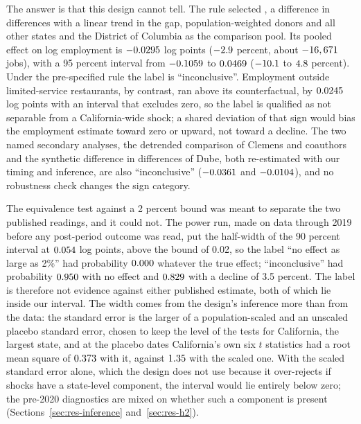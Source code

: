 The answer is that this design cannot tell. The rule selected , a
difference in differences with a linear trend in the gap, population-weighted donors and all
other states and the District of Columbia as the comparison pool. Its pooled effect on log
employment is $-0.0295$ log points ($-2.9$ percent, about $-16,671$ jobs), with a 95
percent interval from $-0.1059$ to $0.0469$ ($-10.1$ to $4.8$
percent). Under the pre-specified rule the label is
``inconclusive''. Employment outside limited-service restaurants, by contrast, ran above its
counterfactual, by $0.0245$ log points with an interval that excludes zero, so the label
is qualified as not separable from a California-wide shock; a shared deviation of that sign
would bias the employment estimate toward zero or upward, not toward a decline. The two named
secondary analyses, the detrended comparison of Clemens and coauthors and the synthetic
difference in differences of Dube, both re-estimated with our timing and inference, are also
``inconclusive'' ($-0.0361$ and $-0.0104$), and no robustness check changes the sign category.

The equivalence test against a 2 percent bound was meant to separate the two published
readings, and it could not. The power run, made on data through 2019 before any post-period
outcome was read, put the half-width of the 90 percent interval at $0.054$ log points,
above the bound of 0.02, so the label ``no effect as large as 2\%'' had probability
$0.000$ whatever the true effect; ``inconclusive'' had probability
$0.950$ with no effect and $0.829$ with a decline of 3.5 percent.
The label is therefore not evidence against either published estimate, both of which lie inside
our interval. The width comes from the design's inference more than from the data: the standard
error is the larger of a population-scaled and an unscaled placebo standard error, chosen to keep
the level of the tests for California, the largest state, and at the placebo dates California's
own six $t$ statistics had a root mean square of $0.373$ with it, against
$1.35$ with the scaled one. With the scaled standard error alone, which the design
does not use because it over-rejects if shocks have a state-level component, the interval would
lie entirely below zero; the pre-2020 diagnostics are mixed on whether such a component is present
(Sections~\ref{sec:res-inference} and~\ref{sec:res-h2}).

